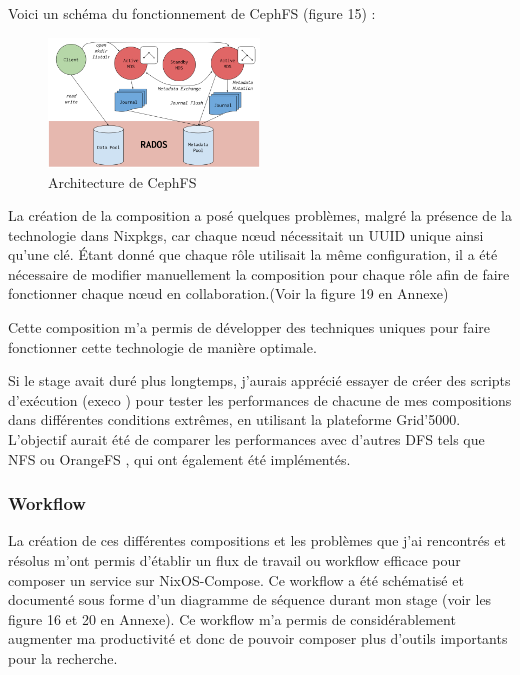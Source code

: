 \documentclass[a4paper,french,12pt, titlepage]{article}
\begin{document}
Voici un schéma du fonctionnement de CephFS (figure 15) :

\begin{figure}[h]
\centering
\includegraphics[width=0.5\textwidth,height=0.5\textheight,keepaspectratio]{images/shema-cephfs.png}
\caption{Architecture de CephFS}
\end{figure}

La création de la composition a posé quelques problèmes, malgré la
présence de la technologie dans Nixpkgs, car chaque nœud nécessitait un
UUID unique ainsi qu'une clé. Étant donné que chaque rôle utilisait la
même configuration, il a été nécessaire de modifier manuellement la
composition pour chaque rôle afin de faire fonctionner chaque nœud en
collaboration.(Voir la figure 19 en Annexe)\newline

Cette composition m'a permis de développer des techniques uniques pour
faire fonctionner cette technologie de manière optimale.\newline

Si le stage avait duré plus longtemps, j'aurais apprécié essayer de
créer des scripts d'exécution (execo \cite{execo2013}) pour tester les
performances de chacune de mes compositions dans différentes conditions
extrêmes, en utilisant la plateforme Grid'5000. L'objectif aurait été de
comparer les performances avec d'autres DFS tels que NFS \cite{nfs1994}
ou OrangeFS \cite{orangefs2011}, qui ont également été
implémentés.\newline

\hypertarget{workflow}{%
\subsubsection{Workflow}\label{workflow}}

La création de ces différentes compositions et les problèmes que j'ai
rencontrés et résolus m'ont permis d'établir un flux de travail ou
workflow efficace pour composer un service sur NixOS-Compose. Ce
workflow a été schématisé et documenté sous forme d'un diagramme de
séquence durant mon stage (voir les figure 16 et 20 en Annexe). Ce
workflow m'a permis de considérablement augmenter ma productivité et
donc de pouvoir composer plus d'outils importants pour la
recherche.\newline
\end{document}
